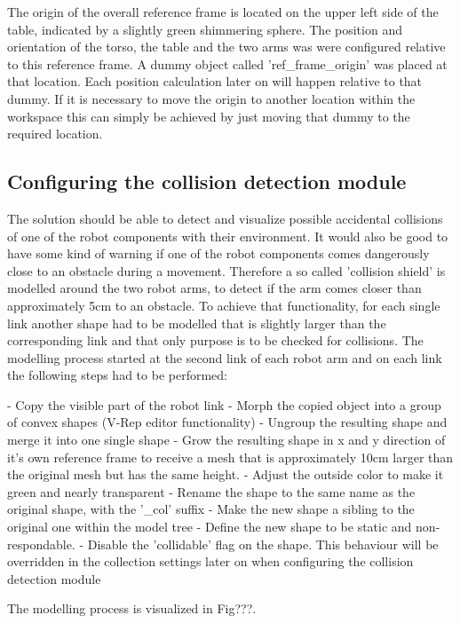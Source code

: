 The origin of the overall reference frame is located on the upper left side of the table, indicated by a slightly green shimmering sphere. The position and orientation of the torso, the table and the two arms was were configured relative to this reference frame. A dummy object called 'ref\_frame\_origin' was placed at that location. Each position calculation later on will happen relative to that dummy. If it is necessary to move the origin to another location within the workspace this can simply be achieved by just moving that dummy to the required location.



\subsection{Configuring the collision detection module}

The solution should be able to detect and visualize possible accidental collisions of one of the robot components with their environment. It would also be good to have some kind of warning if one of the robot components comes dangerously close to an obstacle during a movement. Therefore a so called 'collision shield' is modelled around the two robot arms, to detect if the arm comes closer than approximately 5cm to an obstacle. To achieve that functionality, for each single link another shape had to be modelled that is slightly larger than the corresponding link and that only purpose is to be checked for collisions. The modelling process started at the second link of each robot arm and on each link the following steps had to be performed:

- Copy the visible part of the robot link
- Morph the copied object into a group of convex shapes (V-Rep editor functionality)
- Ungroup the resulting shape and merge it into one single shape
- Grow the resulting shape in x and y direction of it's own reference frame to receive a mesh that
  is approximately 10cm larger than the original mesh but has the same height.
- Adjust the outside color to make it green and nearly transparent
- Rename the shape to the same name as the original shape, with the '\_col' suffix 
- Make the new shape a sibling to the original one within the model tree
- Define the new shape to be static and non-respondable.
- Disable the 'collidable' flag on the shape. This behaviour will be overridden in the collection
  settings later on when configuring the collision detection module

The modelling process is visualized in Fig???.

